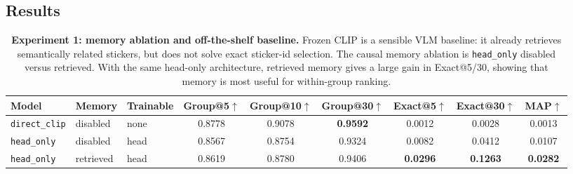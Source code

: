 \documentclass[10pt,twocolumn,letterpaper]{article}
\newcommand{\best}[1]{\textcolor{red!75!black}{\textbf{#1}}}
\begin{document}
\subsection{Results}

\begin{table}[t]
\setlength{\tabcolsep}{3.5pt}
\centering
\scriptsize
\begin{tabular}{l l l c c c c c c}
\toprule
\textbf{Model} & \textbf{Memory} & \textbf{Trainable}
 & \textbf{Group@5}$\uparrow$ & \textbf{Group@10}$\uparrow$
 & \textbf{Group@30}$\uparrow$ & \textbf{Exact@5}$\uparrow$
 & \textbf{Exact@30}$\uparrow$ & \textbf{MAP}$\uparrow$ \\
\midrule
\texttt{direct\_clip} & disabled & none
 & 0.8778 & 0.9078 & \best{0.9592} & 0.0012 & 0.0028 & 0.0013 \\
\texttt{head\_only} & disabled & head
 & 0.8567 & 0.8754 & 0.9324 & 0.0082 & 0.0412 & 0.0107 \\
\texttt{head\_only} & retrieved & head
 & 0.8619 & 0.8780 & 0.9406 & \best{0.0296} & \best{0.1263} & \best{0.0282} \\
\bottomrule
\end{tabular}
\caption{\textbf{Experiment 1: memory ablation and off-the-shelf baseline.}
Frozen CLIP is a sensible VLM baseline: it already retrieves semantically
related stickers, but does not solve exact sticker-id selection. The causal
memory ablation is \texttt{head\_only} disabled versus retrieved. With the
same head-only architecture, retrieved memory gives a large gain in
Exact@5/30, showing that memory is most useful for within-group ranking.}
\label{table:memory-ablation}
\end{table}
\end{document}
